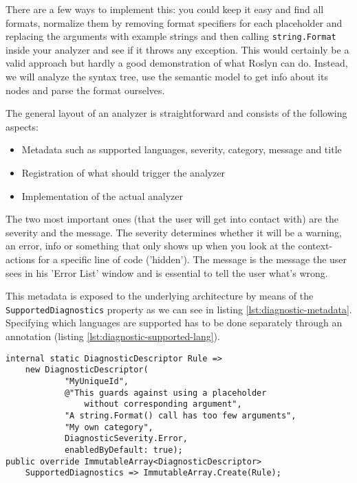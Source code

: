 There are a few ways to implement this: you could keep it easy and find all formats, normalize them by removing format specifiers for each placeholder and replacing the arguments with example strings and then calling \texttt{string.Format} inside your analyzer and see if it throws any exception. This would certainly be a valid approach but hardly a good demonstration of what Roslyn can do. Instead, we will analyze the syntax tree, use the semantic model to get info about its nodes and parse the format ourselves.

The general layout of an analyzer is straightforward and consists of the following aspects:

\begin{itemize}
\item Metadata such as supported languages, severity, category, message and title
\item Registration of what should trigger the analyzer
\item Implementation of the actual analyzer
\end{itemize}

The two most important ones (that the user will get into contact with) are the severity and the message. The severity determines whether it will be a warning, an error, info or something that only shows up when you look at the context-actions for a specific line of code ('hidden'). The message is the message the user sees in his 'Error List' window and is essential to tell the user what's wrong.

This metadata is exposed to the underlying architecture by means of the \texttt{SupportedDiagnostics} property as we can see in listing \ref{lst:diagnostic-metadata}. Specifying which languages are supported has to be done separately through an annotation (listing \ref{lst:diagnostic-supported-lang}).

\begin{lstlisting}[label={lst:diagnostic-metadata}]
internal static DiagnosticDescriptor Rule =>
	new DiagnosticDescriptor(
			"MyUniqueId", 
			@"This guards against using a placeholder 
				without corresponding argument", 
			"A string.Format() call has too few arguments", 
			"My own category", 
			DiagnosticSeverity.Error, 
			enabledByDefault: true);
public override ImmutableArray<DiagnosticDescriptor> 
	SupportedDiagnostics => ImmutableArray.Create(Rule);							
\end{lstlisting}

